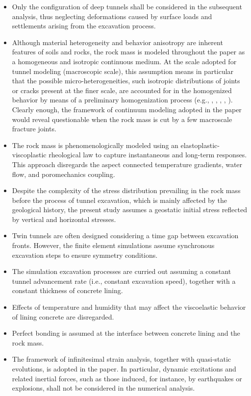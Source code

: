 \documentclass[Journal,letterpaper, NoLists,SectionNumbers]{ascelike-new}
\begin{document}
\begin{itemize}
	\item Only the configuration of deep tunnels shall be considered in the subsequent analysis, thus neglecting deformations caused by surface loads and settlements arising from the excavation process.
	
	\item Although material heterogeneity and behavior anisotropy are inherent features of soils and rocks, the rock mass is modeled throughout the paper as a homogeneous and isotropic continuous medium. At the scale adopted for tunnel modeling (macroscopic scale), this assumption means in particular that the possible micro-heterogeneities, such isotropic distributions of joints or cracks present at the finer scale, are accounted for in the homogenized behavior by means of a preliminary homogenization process (e.g., , , , , ). Clearly enough, the framework of continuum modeling adopted in the paper would reveal questionable when the rock mass is cut by a few macroscale fracture joints.  
	
	\item The rock mass is phenomenologically modeled using an elastoplastic-viscoplastic rheological law to capture instantaneous and long-term responses. This approach disregards the aspect connected temperature gradients, water flow, and poromechanics coupling.
	
	\item Despite the complexity of the stress distribution prevailing in the rock mass before the process of tunnel excavation, which is mainly affected by the geological history, the present study assumes a geostatic initial stress reflected by vertical and horizontal stresses.
	
	\item Twin tunnels are often designed considering a time gap between excavation fronts. However, the finite element simulations assume synchronous excavation steps to ensure symmetry conditions.
	
	\item The simulation excavation processes are curried out assuming a constant tunnel advancement rate (i.e., constant excavation speed), together with a constant thickness of concrete lining.
	
	\item Effects of temperature and humidity that may affect the viscoelastic behavior of lining concrete are disregarded.
	
	\item Perfect bonding is assumed at the interface between concrete lining and the rock mass.
	
	\item The framework of infinitesimal strain analysis, together with quasi-static evolutions, is adopted in the paper. In particular, dynamic excitations and related inertial forces, such as those induced, for instance, by earthquakes or explosions, shall not be considered in the numerical analysis.
	
\end{itemize}
\end{document}
